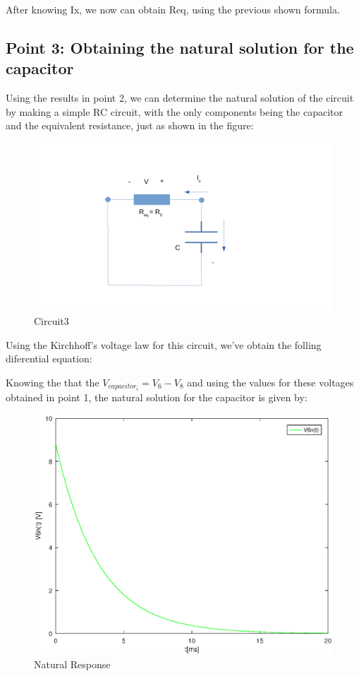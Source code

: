 After knowing Ix, we now can obtain Req, using the previous shown formula.

\subsection{Point 3: Obtaining the natural solution for the capacitor}

Using the results in point 2, we can determine the natural solution of the circuit by making a simple RC circuit, with the only components being the capacitor and the equivalent resistance, just as shown in the figure:

\begin{figure}[H]
\centering
\includegraphics[width = 15cm]{circuit3.pdf}
\caption {Circuit3}
\end{figure}

Using the Kirchhoff's voltage law for this circuit, we've obtain the folling diferential equation:


Knowing the that the $V_{capacitor_i} = V_{6} - V_{8}$ and using the values for these voltages obtained in point 1, the natural solution for the capacitor is given by:


\begin{figure}[H]
\centering
\includegraphics[width = 15cm]{NaturalResponse.eps}
\caption {Natural Response}
\end{figure}



